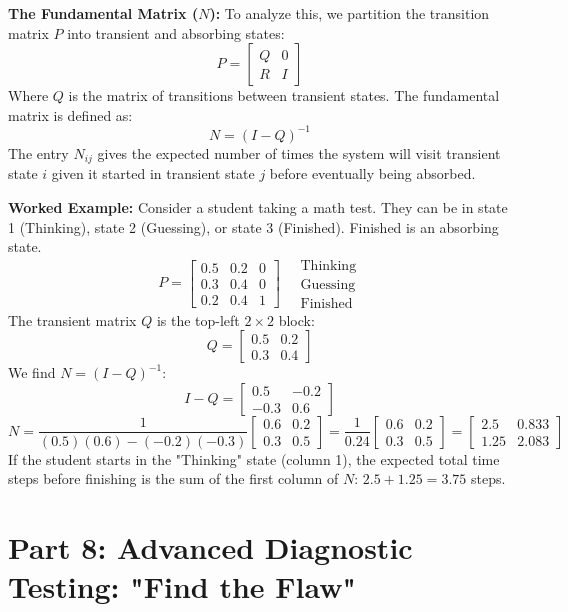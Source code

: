 \documentclass[11pt, letterpaper]{article}
\theoremstyle{definition}
\theoremstyle{remark}
\begin{document}
\textbf{The Fundamental Matrix ($N$):}
To analyze this, we partition the transition matrix $P$ into transient and absorbing states:
\[ P = \begin{bmatrix} Q & 0 \\ R & I \end{bmatrix} \]
Where $Q$ is the matrix of transitions between transient states. The fundamental matrix is defined as:
\[ N = (I - Q)^{-1} \]
The entry $N_{ij}$ gives the expected number of times the system will visit transient state $i$ given it started in transient state $j$ before eventually being absorbed.

\textbf{Worked Example:}
Consider a student taking a math test. They can be in state 1 (Thinking), state 2 (Guessing), or state 3 (Finished). Finished is an absorbing state.
\[ P = \begin{bmatrix} 0.5 & 0.2 & 0 \\ 0.3 & 0.4 & 0 \\ 0.2 & 0.4 & 1 \end{bmatrix} \quad \begin{array}{l} \text{Thinking} \\ \text{Guessing} \\ \text{Finished} \end{array} \]
The transient matrix $Q$ is the top-left $2 \times 2$ block:
\[ Q = \begin{bmatrix} 0.5 & 0.2 \\ 0.3 & 0.4 \end{bmatrix} \]
We find $N = (I - Q)^{-1}$:
\[ I - Q = \begin{bmatrix} 0.5 & -0.2 \\ -0.3 & 0.6 \end{bmatrix} \]
\[ N = \frac{1}{(0.5)(0.6) - (-0.2)(-0.3)} \begin{bmatrix} 0.6 & 0.2 \\ 0.3 & 0.5 \end{bmatrix} = \frac{1}{0.24} \begin{bmatrix} 0.6 & 0.2 \\ 0.3 & 0.5 \end{bmatrix} = \begin{bmatrix} 2.5 & 0.833 \\ 1.25 & 2.083 \end{bmatrix} \]
If the student starts in the "Thinking" state (column 1), the expected total time steps before finishing is the sum of the first column of $N$: $2.5 + 1.25 = 3.75$ steps.

\newpage
\section{Part 8: Advanced Diagnostic Testing: "Find the Flaw"}
\end{document}
